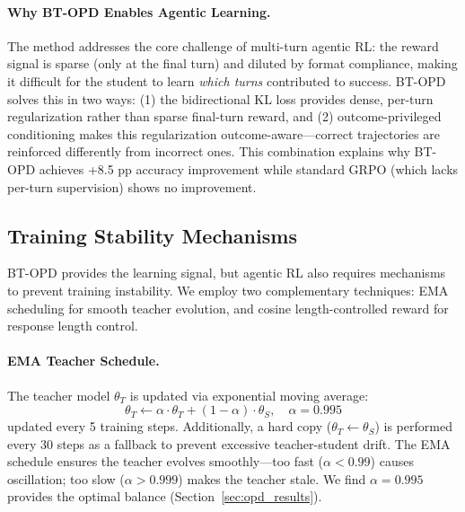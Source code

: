 \documentclass{article}
\begin{document}
\paragraph{Why BT-OPD Enables Agentic Learning.}
The method addresses the core challenge of multi-turn agentic RL: the reward signal is sparse (only at the final turn) and diluted by format compliance, making it difficult for the student to learn \emph{which turns} contributed to success. BT-OPD solves this in two ways: (1) the bidirectional KL loss provides dense, per-turn regularization rather than sparse final-turn reward, and (2) outcome-privileged conditioning makes this regularization outcome-aware---correct trajectories are reinforced differently from incorrect ones. This combination explains why BT-OPD achieves +8.5 pp accuracy improvement while standard GRPO (which lacks per-turn supervision) shows no improvement.


\subsection{Training Stability Mechanisms}
\label{sec:stability}

BT-OPD provides the learning signal, but agentic RL also requires mechanisms to prevent training instability. We employ two complementary techniques: EMA scheduling for smooth teacher evolution, and cosine length-controlled reward for response length control.

\paragraph{EMA Teacher Schedule.}
The teacher model $\theta_T$ is updated via exponential moving average:
\begin{equation}
    \theta_T \leftarrow \alpha \cdot \theta_T + (1 - \alpha) \cdot \theta_S, \quad \alpha = 0.995
\end{equation}
updated every 5 training steps. Additionally, a hard copy ($\theta_T \leftarrow \theta_S$) is performed every 30 steps as a fallback to prevent excessive teacher-student drift. The EMA schedule ensures the teacher evolves smoothly---too fast ($\alpha < 0.99$) causes oscillation; too slow ($\alpha > 0.999$) makes the teacher stale. We find $\alpha = 0.995$ provides the optimal balance (Section~\ref{sec:opd_results}).
\end{document}
